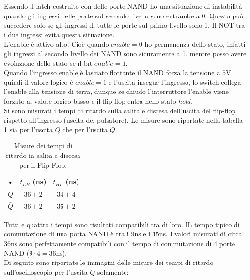 \documentclass[10pt,a4paper]{article}
\begin{document}
Essendo il latch costruito con delle porte NAND ho una situazione di instabilità quando gli ingressi delle porte sul secondo livello sono entrambe a 0. Questo può succedere solo se gli ingressi di tutte le porte sul primo livello sono 1. Il NOT tra i due ingressi evita questa situazione.\\
L'enable è attivo alto. Cioè quando $enable = 0$ ho permanenza dello stato, infatti gli ingressi al secondo livello dei NAND sono sicuramente a 1. mentre posso avere evoluzione dello stato se il bit $enable = 1$.\\
Quando l'ingresso enable è lasciato flottante il NAND forza la tensione a $5$V quindi il valore logico è   $enable = 1$ e l'uscita insegue l'ingresso, lo switch collega l'enable alla tensione di terra, dunque se chiudo l'interruttore l'enable viene forzato al valore logico basso e il flip-flop entra nello stato \emph{hold}.\\

Si sono misurati i tempi di ritardo sulla salita e discesa dell'uscita del flip-flop rispetto all'ingresso (uscita del pulsatore). Le misure sono riportate nella tabella \ref{ritardo} sia per l'uscita $Q$ che per l'uscita $\bar{Q}$.

\begin{table}[!htb]
\centering
\begin{tabular}{|c|c|c|}
\hline 
• & $t_{LH}$ (ns) & $t_{HL}$ (ns)\\
\hline
$Q$ & $36 \pm 2$ & $34 \pm 4$\\
\hline
$\bar{Q}$ & $36 \pm 2$ & $36 \pm 2$\\
\hline
\end{tabular}
\caption{Misure dei tempi di ritardo in salita e discesa per il Flip-Flop.\label{ritardo}}
\end{table}

Tutti e quattro i tempi sono risultati compatibili tra di loro. IL tempo tipico di commutazione di una porta NAND è tra i $9$ns e i $15$ns. I valori misurati di circa $36$ns sono perfettamente compatibili con il tempo di commutazione di 4 porte NAND ($9 \cdot 4 = 36$ns).\\

Di seguito sono riportate le immagini delle misure dei tempi di ritardo sull'oscilloscopio per l'uscita $Q$ solamente:\\
\end{document}
